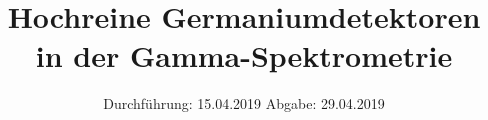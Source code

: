 

\subject{VERSUCH NUMMER 18}
\title{Hochreine Germaniumdetektoren in der Gamma-Spektrometrie}
\date{
  Durchführung: 15.04.2019
  \hspace{3em}
  Abgabe: 29.04.2019
}



\thispagestyle{empty}
\maketitle
\thispagestyle{empty}
\tableofcontents
\newpage
\setcounter{page}{1}


% 




\nocite{*}
\printbibliography


